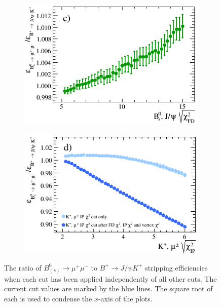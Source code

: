 \begin{figure}[htbp]
    \begin{subfigure}[b]{0.48\textwidth}
        \includegraphics[width=\textwidth]{./Figs/Selection/BsMuMu_JpsiK_FD.png}
        \label{fig:FD_ratio}
    \end{subfigure}
   \begin{subfigure}[b]{0.48\textwidth}
        \includegraphics[width=\textwidth]{./Figs/Selection/Bs2MuMu_JpsiK_daughter_IP.png}
        \label{fig:IPS_ratio}
    \end{subfigure}
    \caption{The ratio of $B^{0}_{(s)}\to\mu^{+} \mu^{-}$ to $B^{+}\to J/\psi K^{+}$ stripping efficiencies when each cut has been applied independently of all other cuts. The current cut values are marked by the blue lines. The square root of each \chisqd is used to condense the $x$-axis of the plots.}
    \label{fig:ratioplotsJpsik}
\end{figure}


